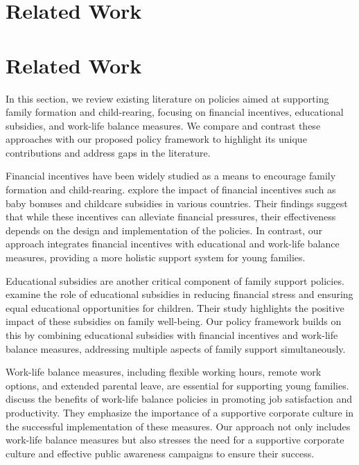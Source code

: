 \documentclass{article} %
\begin{document}
\section{Related Work}
\label{sec:related}
\section{Related Work}
\label{sec:related}

In this section, we review existing literature on policies aimed at supporting family formation and child-rearing, focusing on financial incentives, educational subsidies, and work-life balance measures. We compare and contrast these approaches with our proposed policy framework to highlight its unique contributions and address gaps in the literature.

Financial incentives have been widely studied as a means to encourage family formation and child-rearing. \citet{zhou2023peer} explore the impact of financial incentives such as baby bonuses and childcare subsidies in various countries. Their findings suggest that while these incentives can alleviate financial pressures, their effectiveness depends on the design and implementation of the policies. In contrast, our approach integrates financial incentives with educational and work-life balance measures, providing a more holistic support system for young families.

Educational subsidies are another critical component of family support policies. \citet{west2023agent} examine the role of educational subsidies in reducing financial stress and ensuring equal educational opportunities for children. Their study highlights the positive impact of these subsidies on family well-being. Our policy framework builds on this by combining educational subsidies with financial incentives and work-life balance measures, addressing multiple aspects of family support simultaneously.

Work-life balance measures, including flexible working hours, remote work options, and extended parental leave, are essential for supporting young families. \citet{shanahan2023role} discuss the benefits of work-life balance policies in promoting job satisfaction and productivity. They emphasize the importance of a supportive corporate culture in the successful implementation of these measures. Our approach not only includes work-life balance measures but also stresses the need for a supportive corporate culture and effective public awareness campaigns to ensure their success.
\end{document}

